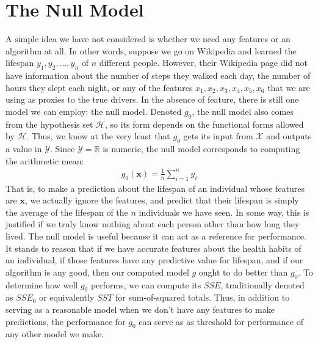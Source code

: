 \documentclass[12pt]{article}
\begin{document}
	\section{The Null Model}
	A simple idea we have not considered is whether we need any
	features or an algorithm at all. In other words, suppose
	we go on Wikipedia and learned the lifespan $y_1,y_2,\ldots,y_n$
	of $n$ different people. However, their Wikipedia page did not
	have information about the number of steps they walked each day,
	the number of hours they slept each night, or any of the features
	$x_1,x_2,x_3,x_4,x_5, x_6$ that we are using as proxies to the true drivers.
	In the absence of feature, there is still one model we can employ:
	the null model. Denoted $g_0$, the null model also comes from
	the hypothesis set $\mathcal{H}$, so its form depends on the
	functional forms allowed by $\mathcal{H}$. Thus, we know at the
	very least that $g_0$ gets its input from $\mathcal{X}$ and
	outputs a value in $\mathcal{Y}$. Since $\mathcal{Y}=\mathbb{R}$
	is numeric, the null model corresponds to computing the arithmetic
	mean:
	\begin{align*}
		g_0(\bm{x})= \frac{1}{n}\sum_{i=1}^{n}y_i
	\end{align*}
	That is, to make a prediction about the lifespan of an individual
	whose features are $\bm{x}$, we actually ignore the features,
	and predict that their lifespan is simply the average of the lifespan
	of the $n$ individuals we have seen. In some way, this is justified
	if we truly know nothing about each person other than how long they
	lived. The null model is useful because it can act as a reference for
	performance. It stands to reason that if we have accurate features
	about the health habits of an individual, if those features have
	any predictive value for lifespan, and if our algorithm
	is any good, then our computed model $g$ ought to do better than $g_0$.
	To determine how well $g_0$ performs, we can compute its $SSE$, traditionally denoted
	as $SSE_0$ or equivalently $SST$ for sum-of-squared totals. Thus, in addition to
	serving as a reasonable model when we don't have any features to
	make predictions, the performance for $g_0$ can serve as as threshold
	for performance of any other model we make.
\end{document}
